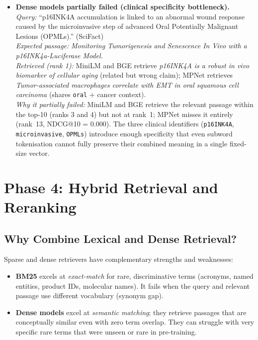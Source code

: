 \documentclass[12pt, a4paper]{article}
\makeatletter
\newcommand{\ndcg}{NDCG@10}
\newcommand{\scifact}{SciFact}
\makeatother
\begin{document}
\begin{itemize}
\item \textbf{Dense models partially failed (clinical specificity bottleneck).}\\
  \textit{Query:} ``p16INK4A accumulation is linked to an abnormal wound response
    caused by the microinvasive step of advanced Oral Potentially Malignant
    Lesions (OPMLs).'' (\scifact{})\\
  \textit{Expected passage:} \textit{Monitoring Tumorigenesis and Senescence In
    Vivo with a p16INK4a-Luciferase Model.}\\
  \textit{Retrieved (rank 1):} MiniLM and BGE retrieve \textit{p16INK4A is a
    robust in vivo biomarker of cellular aging} (related but wrong claim);
    MPNet retrieves \textit{Tumor-associated macrophages correlate with EMT in
    oral squamous cell carcinoma} (shares \texttt{oral} + cancer context).\\
  \textit{Why it partially failed:} MiniLM and BGE retrieve the relevant passage
    within the top-10 (ranks 3 and 4) but not at rank~1; MPNet misses it
    entirely (rank~13, \ndcg{} = 0.000).  The three clinical identifiers
    (\texttt{p16INK4A}, \texttt{microinvasive}, \texttt{OPMLs}) introduce enough
    specificity that even subword tokenisation cannot fully preserve their
    combined meaning in a single fixed-size vector.

\end{itemize}

\section{Phase 4: Hybrid Retrieval and Reranking}
\label{sec:hybrid}

\subsection{Why Combine Lexical and Dense Retrieval?}

Sparse and dense retrievers have complementary strengths and weaknesses:

\begin{itemize}
  \item \textbf{BM25} excels at \emph{exact-match} for rare, discriminative
        terms (acronyms, named entities, product IDs, molecular names).
        It fails when the query and relevant passage use different vocabulary
        (synonym gap).
  \item \textbf{Dense models} excel at \emph{semantic matching}; they
        retrieve passages that are conceptually similar even with zero term
        overlap.  They can struggle with very specific rare terms that were
        unseen or rare in pre-training.
\end{itemize}
\end{document}
